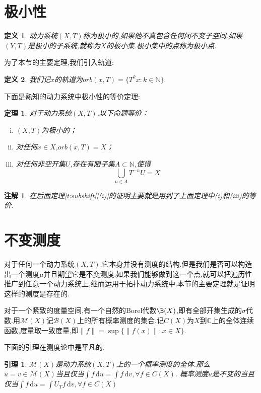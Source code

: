 \documentclass[a4paper,11pt,oneside]{book}
\newtheorem{theorem}{\textbf{\hspace{0.7cm}定理}}[section]
\newtheorem{lemma}{\textbf{\hspace{0.7cm}引理}}[section]
\newtheorem{definition}{\textbf{\hspace{0.7cm}定义}}[section]
\newtheorem{remark}{\textbf{\hspace{0.7cm}注解}}[section]
\begin{document}
\section{极小性}
\begin{definition}
动力系统$(X,T)$称为极小的,如果他不真包含任何闭不变子空间.如果$(Y,T)$是极小的子系统,就称为$X$的极小集.极小集中的点称为极小点.
\end{definition}
为了本节的主要定理,我们引入轨道:
\begin{definition}
我们记$x$的轨道为$orb(x,T)=\{T^kx:k\in\mathbb{N}\}.$
\end{definition}
下面是熟知的动力系统中极小性的等价定理:
\begin{theorem}
\label{t:minimal}
对于动力系统$(X,T)$,以下命题等价：
\begin{enumerate}[(i)]
\item $(X,T)$为极小的；
\item 对任何$x\in X$,$\overline{orb(x,T)}=X$；
\item 对任何非空开集$U$,存在有限子集$A\subset \mathbb{N}$,使得$$\bigcup_{n\in A}T^{-n}U=X$$
\end{enumerate}
\end{theorem}
\begin{remark}
在后面定理\ref{t:subshift}[(i)]的证明主要就是用到了上面定理中(i)和(iii)的等价.
\end{remark}



\section{不变测度}
对于任何一个动力系统$(X,T)$,它本身并没有测度的结构.但是我们是否可以构造出一个测度$\mu$并且期望它是不变测度.如果我们能够做到这一个点,就可以把遍历性推广到任意一个动力系统上,继而运用于拓扑动力系统中.本节的主要定理就是证明这样的测度是存在的.

对于一个紧致的度量空间,有一个自然的Borel代数$\B (X)$,即有全部开集生成的$\sigma$代数.用$\mathcal{M}(X)$记$\mathcal{B}(X)$上的所有概率测度的集合.记$C(X)$为$X$到$\mathbb{C}$上的全体连续函数,度量取一致度量,即$\|f\|=\sup\{\|f(x)\|:x\in X\}$.

下面的引理在测度论中是平凡的.
\begin{lemma}
\label{l}
$\mathcal{M}(X)$是动力系统$(X,T)$上的一个概率测度的全体.那么$u=v\in \mathcal{M}(X)$当且仅当$\int\!f \, \mathrm{d}u=\int f\, \mathrm{d}v,\forall f\in C(X)$.
概率测度$u$是不变的当且仅当$\int\!f \, \mathrm{d}u=\int\! U_Tf\, \mathrm{d}v,\forall f\in C(X)$
\end{lemma}
\end{document}
